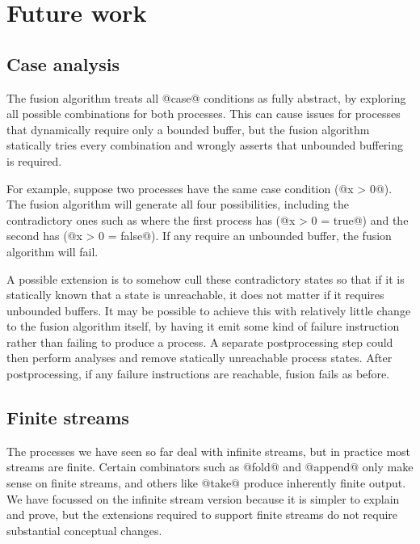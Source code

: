 
\chapter{Future work}
\label{s:FutureWork}


\section{Case analysis}
\label{s:FullyAbstractCase}

The fusion algorithm treats all @case@ conditions as fully abstract, by exploring all possible combinations for both processes.
This can cause issues for processes that dynamically require only a bounded buffer, but the fusion algorithm statically tries every combination and wrongly asserts that unbounded buffering is required.

For example, suppose two processes have the same case condition (@x > 0@).
The fusion algorithm will generate all four possibilities, including the contradictory ones such as where the first process has (@x > 0 = true@) and the second has (@x > 0 = false@).
If any require an unbounded buffer, the fusion algorithm will fail.

A possible extension is to somehow cull these contradictory states so that if it is statically known that a state is unreachable, it does not matter if it requires unbounded buffers.
It may be possible to achieve this with relatively little change to the fusion algorithm itself, by having it emit some kind of failure instruction rather than failing to produce a process.
A separate postprocessing step could then perform analyses and remove statically unreachable process states.
After postprocessing, if any failure instructions are reachable, fusion fails as before.


\section{Finite streams}
\label{s:Finite}

The processes we have seen so far deal with infinite streams, but in practice most streams are finite. Certain combinators such as @fold@ and @append@ only make sense on finite streams, and others like @take@ produce inherently finite output. We have focussed on the infinite stream version because it is simpler to explain and prove, but the extensions required to support finite streams do not require substantial conceptual changes.


